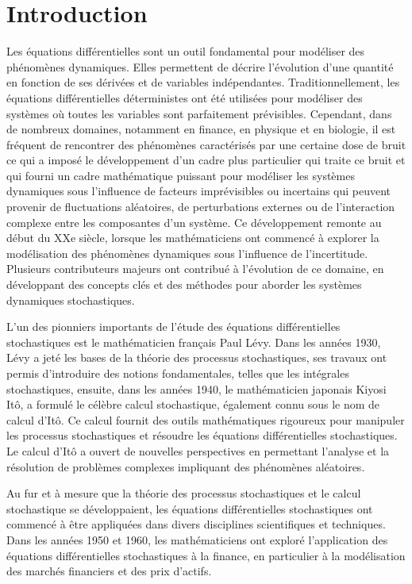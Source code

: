 \documentclass[A4paper,12pt]{report}
\begin{document}
\chapter*{Introduction}	
Les équations différentielles sont un outil fondamental pour modéliser des phénomènes dynamiques. Elles permettent de décrire l'évolution d'une quantité en fonction de ses dérivées et de variables indépendantes. Traditionnellement, les équations différentielles déterministes ont été utilisées pour modéliser des systèmes où toutes les variables sont parfaitement prévisibles. Cependant, dans de nombreux domaines, notamment en finance, en physique et en biologie, il est fréquent de rencontrer des phénomènes caractérisés par une certaine dose de bruit ce qui a imposé le développement d'un cadre plus particulier qui traite ce bruit et qui fourni un cadre mathématique puissant pour modéliser les systèmes dynamiques sous l'influence de facteurs imprévisibles ou incertains qui peuvent provenir de fluctuations aléatoires, de perturbations externes ou de l'interaction complexe entre les composantes d'un système. Ce développement remonte au début du XXe siècle, lorsque les mathématiciens ont commencé à explorer la modélisation des phénomènes dynamiques sous l'influence de l'incertitude. Plusieurs contributeurs majeurs ont contribué à l'évolution de ce domaine, en développant des concepts clés et des méthodes pour aborder les systèmes dynamiques stochastiques.

L'un des pionniers importants de l'étude des équations différentielles stochastiques est le mathématicien français Paul Lévy. Dans les années 1930, Lévy a jeté les bases de la théorie des processus stochastiques, ses travaux ont permis d'introduire des notions fondamentales, telles que les intégrales stochastiques, ensuite, dans les années 1940, le mathématicien japonais Kiyosi Itô, a formulé le célèbre calcul stochastique, également connu sous le nom de calcul d'Itô. Ce calcul fournit des outils mathématiques rigoureux pour manipuler les processus stochastiques et résoudre les équations différentielles stochastiques. Le calcul d'Itô a ouvert de nouvelles perspectives en permettant l'analyse et la résolution de problèmes complexes impliquant des phénomènes aléatoires.

Au fur et à mesure que la théorie des processus stochastiques et le calcul stochastique se développaient, les équations différentielles stochastiques ont commencé à être appliquées dans divers disciplines scientifiques et techniques. Dans les années 1950 et 1960, les mathématiciens ont exploré l'application des équations différentielles stochastiques à la finance, en particulier à la modélisation des marchés financiers et des prix d'actifs.
\end{document}
